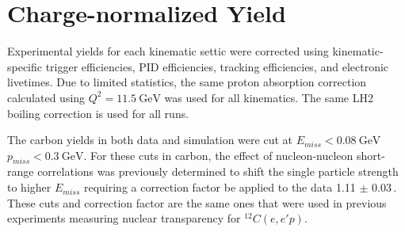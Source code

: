 \section{Charge-normalized Yield}
Experimental yields for each kinematic settic were corrected using
kinematic-specific trigger efficiencies, PID efficiencies, tracking
efficiencies, and electronic livetimes.
Due to limited statistics, the same proton absorption correction calculated
using $Q^2=\SI{11.5}{\giga\electronvolt}$ was used for all kinematics.
The same LH2 boiling correction is used for all runs.

The carbon yields in both data and simulation were cut at
$E_{miss} < \SI{0.08}{\giga\electronvolt}$
$p_{miss} < \SI{0.3}{\giga\electronvolt}$.
For these cuts in carbon, the effect of nucleon-nucleon short-range
correlations was previously determined to shift the single particle strength
to higher $E_{miss}$ requiring a correction factor be applied to the data
1.11 $\pm$ 0.03\,\cite{ONeill_1995}.
These cuts and correction factor are the same ones that were used in previous
experiments measuring nuclear transparency for ${}^{12}C(e,e'p)$.
